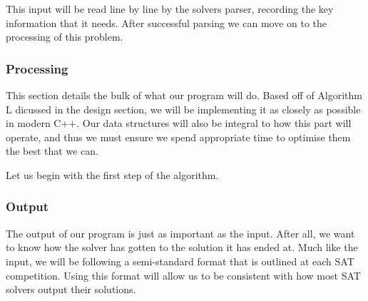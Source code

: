 \documentclass{article}
\begin{document}
This input will be read line by line by the solvers parser, recording the key information that it
needs. After successful parsing we can move on to the processing of this problem.

\subsubsection{Processing}
This section details the bulk of what our program will do. Based off of Algorithm L dicussed in the design section, we will be
implementing it as closely as possible in modern C++. Our data structures will also be integral to how this part will operate, and
thus we must ensure we spend appropriate time to optimise them the best that we can.

Let us begin with the first step of the algorithm.


\subsubsection{Output}

The output of our program is just as important as the input. After all, we want to know how the
solver has gotten to the solution it has ended at. Much like the input, we will be following a
semi-standard format that is outlined at each SAT competition. Using this format will allow us to be
consistent with how most SAT solvers output their solutions.
\end{document}
